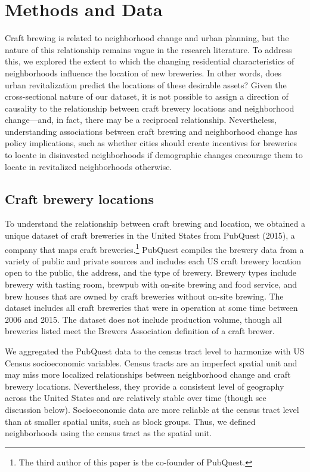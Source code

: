 \documentclass[]{article}
\begin{document}
\section{Methods and Data}\label{methods-and-data}

Craft brewing is related to neighborhood change and urban planning, but
the nature of this relationship remains vague in the research
literature. To address this, we explored the extent to which the
changing residential characteristics of neighborhoods influence the
location of new breweries. In other words, does urban revitalization
predict the locations of these desirable assets? Given the
cross-sectional nature of our dataset, it is not possible to assign a
direction of causality to the relationship between craft brewery
locations and neighborhood change---and, in fact, there may be a
reciprocal relationship. Nevertheless, understanding associations
between craft brewing and neighborhood change has policy implications,
such as whether cities should create incentives for breweries to locate
in disinvested neighborhoods if demographic changes encourage them to
locate in revitalized neighborhoods otherwise.

\subsection{Craft brewery locations}\label{craft-brewery-locations}

To understand the relationship between craft brewing and location, we
obtained a unique dataset of craft breweries in the United States from
PubQuest (2015), a company that maps craft breweries.\footnote{The third
  author of this paper is the co-founder of PubQuest.} PubQuest compiles
the brewery data from a variety of public and private sources and
includes each US craft brewery location open to the public, the address,
and the type of brewery. Brewery types include brewery with tasting
room, brewpub with on-site brewing and food service, and brew houses
that are owned by craft breweries without on-site brewing. The dataset
includes all craft breweries that were in operation at some time between
2006 and 2015. The dataset does not include production volume, though
all breweries listed meet the Brewers Association definition of a craft
brewer.

We aggregated the PubQuest data to the census tract level to harmonize
with US Census socioeconomic variables. Census tracts are an imperfect
spatial unit and may miss more localized relationships between
neighborhood change and craft brewery locations. Nevertheless, they
provide a consistent level of geography across the United States and are
relatively stable over time (though see discussion below). Socioeconomic
data are more reliable at the census tract level than at smaller spatial
units, such as block groups. Thus, we defined neighborhoods using the
census tract as the spatial unit.
\end{document}
